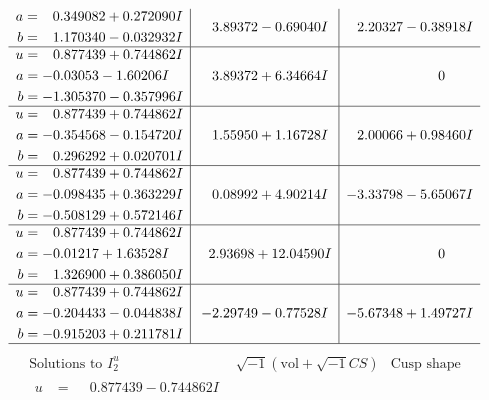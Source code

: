 \documentclass[1p]{elsarticle_modified}
\theoremstyle{definition}
\newcommand{\I}{\sqrt{-1}}
\begin{document}
$$\begin{array}{c|c|c}
\begin{aligned}
a &= \phantom{-}0.349082 + 0.272090 I \\
b &= \phantom{-}1.170340 - 0.032932 I\end{aligned}
 & \phantom{-}3.89372 - 0.69040 I & \phantom{-}2.20327 - 0.38918 I \\ \hline\begin{aligned}
u &= \phantom{-}0.877439 + 0.744862 I \\
a &= -0.03053 - 1.60206 I \\
b &= -1.305370 - 0.357996 I\end{aligned}
 & \phantom{-}3.89372 + 6.34664 I & \phantom{-0.000000 } 0 \\ \hline\begin{aligned}
u &= \phantom{-}0.877439 + 0.744862 I \\
a &= -0.354568 - 0.154720 I \\
b &= \phantom{-}0.296292 + 0.020701 I\end{aligned}
 & \phantom{-}1.55950 + 1.16728 I & \phantom{-}2.00066 + 0.98460 I \\ \hline\begin{aligned}
u &= \phantom{-}0.877439 + 0.744862 I \\
a &= -0.098435 + 0.363229 I \\
b &= -0.508129 + 0.572146 I\end{aligned}
 & \phantom{-}0.08992 + 4.90214 I & -3.33798 - 5.65067 I \\ \hline\begin{aligned}
u &= \phantom{-}0.877439 + 0.744862 I \\
a &= -0.01217 + 1.63528 I \\
b &= \phantom{-}1.326900 + 0.386050 I\end{aligned}
 & \phantom{-}2.93698 + 12.04590 I & \phantom{-0.000000 } 0 \\ \hline\begin{aligned}
u &= \phantom{-}0.877439 + 0.744862 I \\
a &= -0.204433 - 0.044838 I \\
b &= -0.915203 + 0.211781 I\end{aligned}
 & -2.29749 - 0.77528 I & -5.67348 + 1.49727 I\\
 \hline 
 \end{array}$$\newpage$$\begin{array}{c|c|c}  
\text{Solutions to }I^u_{2}& \I (\text{vol} + \sqrt{-1}CS) & \text{Cusp shape}\\
 \hline 
\begin{aligned}
u &= \phantom{-}0.877439 - 0.744862 I \\

\end{aligned}
\end{array}$$
\end{document}
